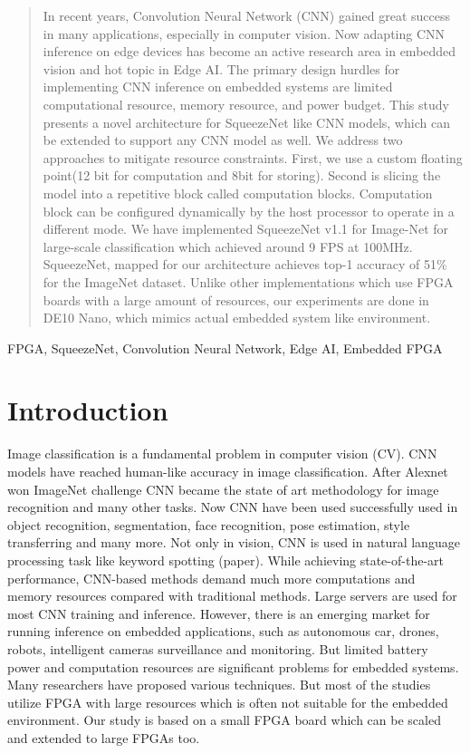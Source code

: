 \documentclass[conference]{IEEEtran}
\begin{document}
\begin{abstract}
In recent years, Convolution Neural Network (CNN) gained great success in many applications, especially in computer vision. Now adapting CNN inference on edge devices has become an active research area in embedded vision and hot topic in Edge AI. The primary design hurdles for implementing CNN inference on embedded systems are limited computational resource, memory resource, and power budget. This study presents a novel architecture for SqueezeNet\cite{squeezenet} like CNN models, which can be extended to support any CNN model as well. We address two approaches to mitigate resource constraints. First, we use a custom floating point(12 bit for computation and 8bit for storing). Second is slicing the model into a repetitive block called computation blocks. Computation block can be configured dynamically by the host processor to operate in a different mode. We have implemented SqueezeNet v1.1 for Image-Net\cite{imagenet} for large-scale classification which achieved around 9 FPS at 100MHz. SqueezeNet, mapped for our architecture achieves top-1 accuracy of 51\% for the ImageNet dataset. Unlike other implementations which use FPGA boards with a large amount of resources, our experiments are done in DE10 Nano, which mimics actual embedded system like environment.

\end{abstract}

\begin{IEEEkeywords}
FPGA, SqueezeNet, Convolution Neural Network,  Edge AI,  Embedded FPGA
\end{IEEEkeywords}

\section{Introduction}
Image classification is a fundamental problem in computer vision (CV). CNN models have reached human-like accuracy in image classification. After Alexnet\cite{alexnet} won ImageNet challenge CNN became the state of art methodology for image recognition and many other tasks. Now CNN have been used successfully used in object recognition, segmentation, face recognition, pose estimation, style transferring and many more. Not only in vision, CNN is used in natural language processing task like keyword spotting (paper). While achieving state-of-the-art performance, CNN-based methods demand much more computations and memory resources compared with traditional methods. Large servers are used for most CNN training and inference. However, there is an emerging market for running inference on embedded applications, such as autonomous car, drones, robots, intelligent cameras surveillance and monitoring. But limited battery power and computation resources are significant problems for embedded systems. Many researchers have proposed various techniques. But most of the studies utilize FPGA with large resources \cite{zynqnet} which is often not suitable for the embedded environment. Our study is based on a small FPGA board which can be scaled and extended to large FPGAs too.
\end{document}
